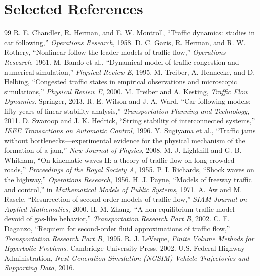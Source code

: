\documentclass[11pt,a4paper,openany]{book}
\numberwithin{equation}{chapter}
\numberwithin{figure}{chapter}
\numberwithin{table}{chapter}
\begin{document}
\chapter{Selected References}
\begin{thebibliography}{99}
 R. E. Chandler, R. Herman, and E. W. Montroll, ``Traffic dynamics: studies in car following,'' \emph{Operations Research}, 1958.
 D. C. Gazis, R. Herman, and R. W. Rothery, ``Nonlinear follow-the-leader models of traffic flow,'' \emph{Operations Research}, 1961.
 M. Bando et al., ``Dynamical model of traffic congestion and numerical simulation,'' \emph{Physical Review E}, 1995.
 M. Treiber, A. Hennecke, and D. Helbing, ``Congested traffic states in empirical observations and microscopic simulations,'' \emph{Physical Review E}, 2000.
 M. Treiber and A. Kesting, \emph{Traffic Flow Dynamics}. Springer, 2013.
 R. E. Wilson and J. A. Ward, ``Car-following models: fifty years of linear stability analysis,'' \emph{Transportation Planning and Technology}, 2011.
 D. Swaroop and J. K. Hedrick, ``String stability of interconnected systems,'' \emph{IEEE Transactions on Automatic Control}, 1996.
 Y. Sugiyama et al., ``Traffic jams without bottlenecks---experimental evidence for the physical mechanism of the formation of a jam,'' \emph{New Journal of Physics}, 2008.
 M. J. Lighthill and G. B. Whitham, ``On kinematic waves II: a theory of traffic flow on long crowded roads,'' \emph{Proceedings of the Royal Society A}, 1955.
 P. I. Richards, ``Shock waves on the highway,'' \emph{Operations Research}, 1956.
 H. J. Payne, ``Models of freeway traffic and control,'' in \emph{Mathematical Models of Public Systems}, 1971.
 A. Aw and M. Rascle, ``Resurrection of second order models of traffic flow,'' \emph{SIAM Journal on Applied Mathematics}, 2000.
 H. M. Zhang, ``A non-equilibrium traffic model devoid of gas-like behavior,'' \emph{Transportation Research Part B}, 2002.
 C. F. Daganzo, ``Requiem for second-order fluid approximations of traffic flow,'' \emph{Transportation Research Part B}, 1995.
 R. J. LeVeque, \emph{Finite Volume Methods for Hyperbolic Problems}. Cambridge University Press, 2002.
 U.S. Federal Highway Administration, \emph{Next Generation Simulation (NGSIM) Vehicle Trajectories and Supporting Data}, 2016.

\end{thebibliography}
\end{document}
